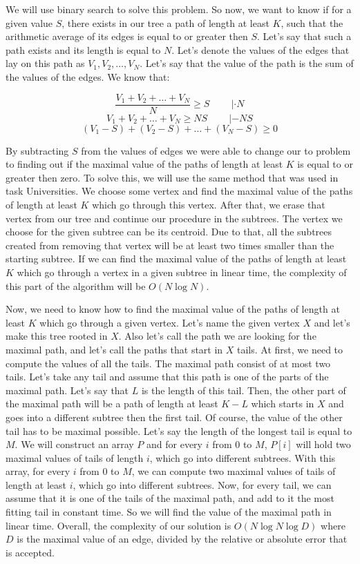 

We will use binary search to solve this problem.
So now, we want to know if for a given value $S$, there exists in our tree a path of length at least $K$,
	such that the arithmetic average of its edges is equal to or greater then $S$.
Let's say that such a path exists and its length is equal to $N$.
Let's denote the values of the edges that lay on this path as $V_1, V_2, \ldots, V_N$.
Let's say that the value of the path is the sum of the values of the edges.
We know that:

\[\frac{V_1 + V_2 + \ldots + V_N}{N} \geqslant S\ \qquad | \cdot N \]
\[V_1 + V_2 + \ldots + V_N \geqslant NS\ \qquad | - NS\]
\[(V_1 - S) + (V_2 - S) + \ldots + (V_N - S) \geqslant 0\]

By subtracting $S$ from the values of edges we were able to change our to problem to finding out
	if the maximal value of the paths of length at least $K$ is equal to or greater then zero.
To solve this, we will use the same method that was used in task Universities.
We choose some vertex and find the maximal value of the paths of length at least $K$ which go through this vertex.
After that, we erase that vertex from our tree and continue our procedure in the subtrees.
The vertex we choose for the given subtree can be its centroid.
Due to that, all the subtrees created from removing that vertex will be at least
	two times smaller than the starting subtree.
If we can find the maximal value of the paths of length at least $K$
	which go through a vertex in a given subtree in linear time,
	the complexity of this part of the algorithm will be $O(N \log N)$.

\bigskip

Now, we need to know how to find the maximal value of the paths of length at least $K$ which go through a given vertex.
Let's name the given vertex $X$ and let's make this tree rooted in $X$.
Also let's call the path we are looking for the maximal path, and let's call the paths that start in $X$ tails.
At first, we need to compute the values of all the tails.
The maximal path consist of at most two tails.
Let's take any tail and assume that this path is one of the parts of the maximal path.
Let's say that $L$ is the length of this tail.
Then, the other part of the maximal path will be a path of length at least $K-L$
	which starts in $X$ and goes into a different subtree then the first tail.
Of course, the value of the other tail has to be maximal possible.
Let's say the length of the longest tail is equal to $M$.
We will construct an array $P$ and for every $i$ from $0$ to $M$, $P[i]$
	will hold two maximal values of tails of length $i$, which go into different subtrees.
With this array, for every $i$ from $0$ to $M$, we can compute two maximal values of tails
	of length at least $i$, which go into different subtrees.
Now, for every tail, we can assume that it is one of the tails of the maximal path,
	and add to it the most fitting tail in constant time.
So we will find the value of the maximal path in linear time.
Overall, the complexity of our solution is $O(N \log N \log D)$ where $D$ is the maximal value
	of an edge, divided by the relative or absolute error that is accepted.
